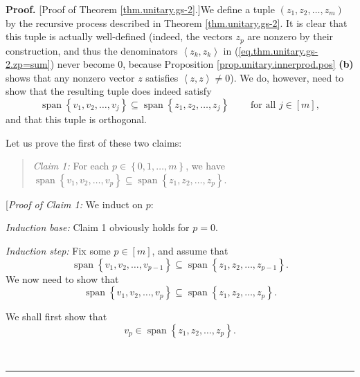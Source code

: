\documentclass[numbers=enddot,12pt,final,onecolumn,notitlepage]{scrartcl}%
\numberwithin{exer}{subsection}
\theoremstyle{definition}
\newenvironment{statement}{\begin{quote}}{\end{quote}}
\newenvironment{proof}[1][Proof]{\noindent\textbf{#1.} }{\ \rule{0.5em}{0.5em}}
\begin{document}
\begin{proof}
[Proof of Theorem \ref{thm.unitary.gs-2}.]We define a tuple $\left(
z_{1},z_{2},\ldots,z_{m}\right)  $ by the recursive process described in
Theorem \ref{thm.unitary.gs-2}. It is clear that this tuple is actually
well-defined (indeed, the vectors $z_{p}$ are nonzero by their construction,
and thus the denominators $\left\langle z_{k},z_{k}\right\rangle $ in
(\ref{eq.thm.unitary.gs-2.zp=sum}) never become $0$, because Proposition
\ref{prop.unitary.innerprod.pos} \textbf{(b)} shows that any nonzero vector
$z$ satisfies $\left\langle z,z\right\rangle \neq0$). We do, however, need to
show that the resulting tuple does indeed satisfy
\[
\operatorname*{span}\left\{  v_{1},v_{2},\ldots,v_{j}\right\}  \subseteq
\operatorname*{span}\left\{  z_{1},z_{2},\ldots,z_{j}\right\}
\ \ \ \ \ \ \ \ \ \ \text{for all }j\in\left[  m\right]  ,
\]
and that this tuple is orthogonal.

Let us prove the first of these two claims:

\begin{statement}
\textit{Claim 1:} For each $p\in\left\{  0,1,\ldots,m\right\}  $, we have
$\operatorname*{span}\left\{  v_{1},v_{2},\ldots,v_{p}\right\}  \subseteq
\operatorname*{span}\left\{  z_{1},z_{2},\ldots,z_{p}\right\}  $.
\end{statement}

[\textit{Proof of Claim 1:} We induct on $p$:

\textit{Induction base:} Claim 1 obviously holds for $p=0$.

\textit{Induction step:} Fix some $p\in\left[  m\right]  $, and assume that%
\begin{equation}
\operatorname*{span}\left\{  v_{1},v_{2},\ldots,v_{p-1}\right\}
\subseteq\operatorname*{span}\left\{  z_{1},z_{2},\ldots,z_{p-1}\right\}  .
\label{pf.thm.unitary.gs-2.4}%
\end{equation}
We now need to show that
\begin{equation}
\operatorname*{span}\left\{  v_{1},v_{2},\ldots,v_{p}\right\}  \subseteq
\operatorname*{span}\left\{  z_{1},z_{2},\ldots,z_{p}\right\}  .
\label{pf.thm.unitary.gs-2.5}%
\end{equation}


We shall first show that
\begin{equation}
v_{p}\in\operatorname*{span}\left\{  z_{1},z_{2},\ldots,z_{p}\right\}  .
\label{pf.thm.unitary.gs-2.5a}%
\end{equation}



\end{proof}
\end{document}
